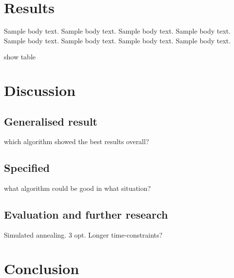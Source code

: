 \documentclass{article}
\begin{document}
\section{Results}\label{sec3}

Sample body text. Sample body text. Sample body text. Sample body text. Sample body text. Sample body text. Sample body text. Sample body text.

show table






\section{Discussion}\label{sec4}


\subsection{Generalised result}\label{subsec1}
which algorithm showed the best results overall?


\subsection{Specified }\label{subsec2}
what algorithm could be good in what situation?


\subsection{Evaluation and further research}\label{subsec3}
Simulated annealing.
3 opt.
Longer time-constraints?


\section{Conclusion}\label{sec5}






\newpage

 \label{sec6}
\end{document}
